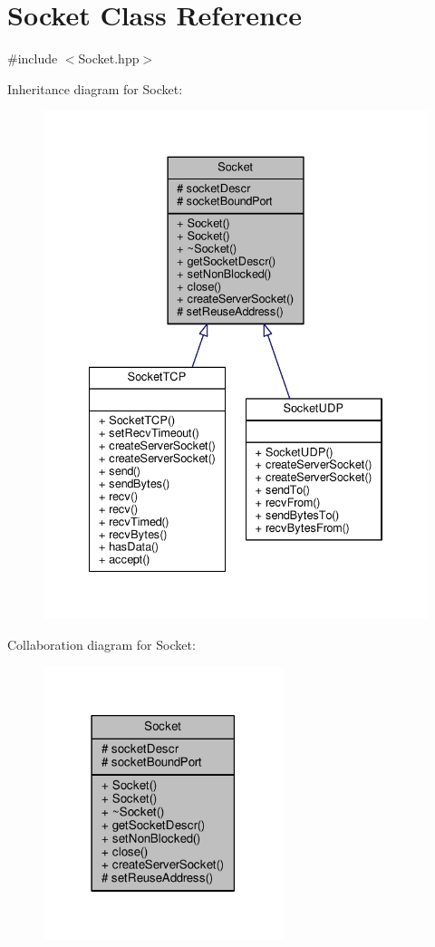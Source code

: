 \hypertarget{class_socket}{\section{Socket Class Reference}
\label{class_socket}
}


{\ttfamily \#include $<$Socket.\-hpp$>$}



Inheritance diagram for Socket\-:
\nopagebreak
\begin{figure}[H]
\begin{center}
\leavevmode
\includegraphics[width=334pt]{class_socket__inherit__graph}
\end{center}
\end{figure}


Collaboration diagram for Socket\-:
\nopagebreak
\begin{figure}[H]
\begin{center}
\leavevmode
\includegraphics[width=198pt]{class_socket__coll__graph}
\end{center}
\end{figure}
